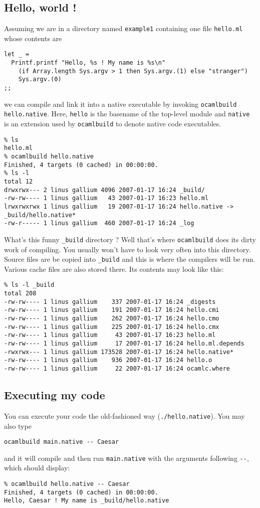 \documentclass[9pt]{article}
\newcommand{\ocb}{\texttt{ocamlbuild}\xspace}
\begin{document}
\subsection{Hello, world !}
Assuming we are in a directory named \texttt{example1} containing one file \texttt{hello.ml}
whose contents are
\begin{verbatim}
let _ =
  Printf.printf "Hello, %s ! My name is %s\n"
    (if Array.length Sys.argv > 1 then Sys.argv.(1) else "stranger")
    Sys.argv.(0)
;;
\end{verbatim}
we can compile and link it into a native executable by invoking \texttt{ocamlbuild hello.native}.
Here, \texttt{hello} is the basename of the top-level module and \texttt{native} is an extension used
by \ocb to denote native code executables.
\begin{verbatim}
% ls
hello.ml
% ocamlbuild hello.native        
Finished, 4 targets (0 cached) in 00:00:00.
% ls -l
total 12
drwxrwx--- 2 linus gallium 4096 2007-01-17 16:24 _build/
-rw-rw---- 1 linus gallium   43 2007-01-17 16:23 hello.ml
lrwxrwxrwx 1 linus gallium   19 2007-01-17 16:24 hello.native -> _build/hello.native*
-rw-r----- 1 linus gallium  460 2007-01-17 16:24 _log
\end{verbatim}
What's this funny \texttt{\_build} directory ?  Well that's where \ocb does its dirty work
of compiling.  You usually won't have to look very often into this directory.  Source files are be copied
into \texttt{\_build} and this is where the compilers will be run.  Various cache files are also stored
there.  Its contents may look like this:
\begin{verbatim}
% ls -l _build 
total 208
-rw-rw---- 1 linus gallium    337 2007-01-17 16:24 _digests
-rw-rw---- 1 linus gallium    191 2007-01-17 16:24 hello.cmi
-rw-rw---- 1 linus gallium    262 2007-01-17 16:24 hello.cmo
-rw-rw---- 1 linus gallium    225 2007-01-17 16:24 hello.cmx
-rw-rw---- 1 linus gallium     43 2007-01-17 16:23 hello.ml
-rw-rw---- 1 linus gallium     17 2007-01-17 16:24 hello.ml.depends
-rwxrwx--- 1 linus gallium 173528 2007-01-17 16:24 hello.native*
-rw-rw---- 1 linus gallium    936 2007-01-17 16:24 hello.o
-rw-rw---- 1 linus gallium     22 2007-01-17 16:24 ocamlc.where
\end{verbatim}
\subsection{Executing my code}
You can execute your code the old-fashioned way (\texttt{./hello.native}).
You may also type
\begin{verbatim}
ocamlbuild main.native -- Caesar
\end{verbatim}
and it will compile and then run \texttt{main.native} with the arguments following \texttt{-{}-},
which should display:
\begin{verbatim}
% ocamlbuild hello.native -- Caesar   
Finished, 4 targets (0 cached) in 00:00:00.
Hello, Caesar ! My name is _build/hello.native
\end{verbatim}
\end{document}
